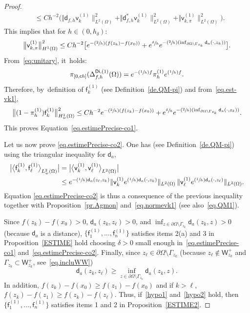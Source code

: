 \documentclass[10pt]{amsart}
\newcommand{\Psfrac}[2]{(\sfrac{#1}{#2})}
\let\lp\langle
\let\rp\rangle
\theoremstyle{plain}
\theoremstyle{definition}
\begin{document}
\begin{proof}
\begin{align}
\label{eq.est-QQ}
& \le Ch^{-2}\bigl(\Vert \mathsf d_{f,h} \mathsf v_k^{(1)} \|_{ L^{2} (\Omega)}^2 + \Vert \mathsf d^*_{f,h} \mathsf v_k^{(1)} \|_{ L^{2} (\Omega)}^2 + \Vert \mathsf v_{k,\pi}^{(1)} \|_{ L^{2} (\Omega)}^2\bigr).
\end{align}
This implies that for $h\in (0,h_\delta)$:
\begin{equation}\label{eq.est-vk1}
\big \| \mathsf v_{k,\pi}^{(1)} \big \|^{2}_{ H^1 (\Omega)}\le C h^{-2} \big[ e^{-\Psfrac 2h(f(z_k)-f(x_0))}+ e^{\sfrac{ \delta }{h}}e^{-\Psfrac 2h(\inf_{ \partial \Omega \setminus \Gamma_{z_k}} \mathsf d_a(\cdot,z_k))}\big].
\end{equation}
From~\eqref{eq:unitary}, it~holds:
\[
\pi_{[0,\mathsf ch]} (\Delta_{f,h}^{\mathsf{Di},(1)} (\Omega))=
e^{-\Psfrac 1hf}\pi_h^{(1)}e^{\Psfrac 1 h f}.
\]
Therefore, by~definition of $ \mathsf f_k^{(1)}$ (see Definition~\ref{de.QM-pi}) and from~\eqref{eq.est-vk1},
\[
\big \Vert (1-\pi_h^{(1)}) \mathsf f_k^{(1)} \big \|^{2}_{ H^{1}_w (\Omega)} \le Ch^{-2}e^{-\Psfrac 2h(f(z_k)-f(x_0))}+ e^{\sfrac{ \delta }{h}} e^{-\Psfrac 2h(\inf_{\partial \Omega \setminus \Gamma_{z_k}} \mathsf d_a(\cdot,z_k))}.
\]
This proves Equation~\eqref{eq.estimePrecise-co1}.

Let us now prove \eqref{eq.estimePrecise-co2}. One has (see Definition~\ref{de.QM-pi}) using the triangular inequality for $\mathsf d_a$,
\[
\begin{aligned}
\bigl\vert \big\lp\mathsf f_k^{(1)}, \mathsf
f_\ell^{(1)}\big\rp_{L^2_w(\Omega)}\bigr|&=\bigl|\big\lp\mathsf v_k^{(1)},
\mathsf v_\ell^{(1)}\big\rp_{L^2(\Omega)}\bigr|\\
&\le e^{-\Psfrac 1h \mathsf d_a(z_\ell,z_k)} \Vert \mathsf
v_k^{(1)}e^{\Psfrac 1h \mathsf d_a(\cdot,z_k)} \Vert_{L^2(\Omega)}\,
\Vert \mathsf v_\ell^{(1)}e^{\Psfrac 1h \mathsf d_a(\cdot,z_\ell)}
\Vert_{L^2(\Omega)}.
\end{aligned}
\]
Equation \eqref{eq.estimePrecise-co2} is thus a consequence of the previous inequality together with Proposition~\ref{pr.Agmon} and~\eqref{eq.normevk1} (see also~\eqref{eq.QM1}).

Since $f(z_k)-f(x_0)>0$, $\mathsf d_a(z_k,z_\ell)>0$, and $ \inf_{z\in \partial \Omega \setminus \Gamma_{z_k}} \mathsf d_a(z_k,z)>0$ (because $\mathsf d_a$ is a distance), $\{\mathsf f_1^{(1)}, \ldots, \mathsf f_n^{(1)}\} $ satisfies items 2(a) and 3 in Proposition~\ref{ESTIME} hold choosing $\delta>0$ small enough in~\eqref{eq.estimePrecise-co1} and~\eqref{eq.estimePrecise-co2}. Finally, since $z_\ell \in \partial \Omega \setminus \Gamma_{z_k}$ (because $z_\ell\notin \mathsf W_{z_k}^+$ and $ \Gamma_{z_k}\subset \mathsf W_{z_k}^+ $, see~\eqref{eq.incluWW})
\[
\mathsf d_a(z_k,z_\ell)\ge \inf_{z\in \partial \Omega \setminus \Gamma_{z_k}} \mathsf d_a(z_k,z).
\]
In addition, $f(z_k)-f(x_0)\!\ge\! f(z_1)-f(x_0)$ and if $k\!>\!\ell$, \hbox{$f(z_k)-f(z_1)\!\ge\! f(z_k)-f(z_\ell)$}.
Thus, if~\eqref{hypo1} and~\eqref{hypo2} hold, then $\{\mathsf f_1^{(1)}, \ldots, \mathsf f_n^{(1)}\} $ satisfies items 1 and 2 in Proposition~\ref{ESTIME2}.
\end{proof}
\end{document}
